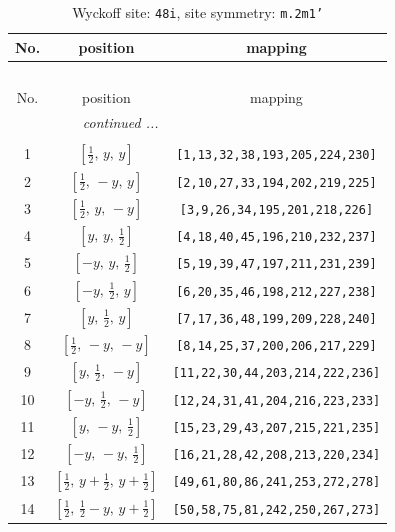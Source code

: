 \documentclass[fleqn,8pt]{jsarticle}
\begin{document}
\begin{longtable}{ccc}
\caption{Wyckoff site: {\tt 48i}, site symmetry: {\tt m.2m1'}}
 \\
 \hline \hline
No. & position & mapping \\ \hline \endfirsthead

\multicolumn{2}{l}{\tablename\ \thetable{}} \\
 \hline \hline
No. & position & mapping \\ \hline \endhead

 \hline \hline
\multicolumn{2}{r}{\footnotesize\it continued ...} \\ \endfoot

 \hline \hline
\multicolumn{2}{r}{} \\ \endlastfoot

1 & $\left[ \frac{1}{2},\, y,\, y \right]$ & {\tt [1,13,32,38,193,205,224,230]} \\ \hline
2 & $\left[ \frac{1}{2},\, - y,\, y \right]$ & {\tt [2,10,27,33,194,202,219,225]} \\ \hline
3 & $\left[ \frac{1}{2},\, y,\, - y \right]$ & {\tt [3,9,26,34,195,201,218,226]} \\ \hline
4 & $\left[ y,\, y,\, \frac{1}{2} \right]$ & {\tt [4,18,40,45,196,210,232,237]} \\ \hline
5 & $\left[ - y,\, y,\, \frac{1}{2} \right]$ & {\tt [5,19,39,47,197,211,231,239]} \\ \hline
6 & $\left[ - y,\, \frac{1}{2},\, y \right]$ & {\tt [6,20,35,46,198,212,227,238]} \\ \hline
7 & $\left[ y,\, \frac{1}{2},\, y \right]$ & {\tt [7,17,36,48,199,209,228,240]} \\ \hline
8 & $\left[ \frac{1}{2},\, - y,\, - y \right]$ & {\tt [8,14,25,37,200,206,217,229]} \\ \hline
9 & $\left[ y,\, \frac{1}{2},\, - y \right]$ & {\tt [11,22,30,44,203,214,222,236]} \\ \hline
10 & $\left[ - y,\, \frac{1}{2},\, - y \right]$ & {\tt [12,24,31,41,204,216,223,233]} \\ \hline
11 & $\left[ y,\, - y,\, \frac{1}{2} \right]$ & {\tt [15,23,29,43,207,215,221,235]} \\ \hline
12 & $\left[ - y,\, - y,\, \frac{1}{2} \right]$ & {\tt [16,21,28,42,208,213,220,234]} \\ \hline
13 & $\left[ \frac{1}{2},\, y + \frac{1}{2},\, y + \frac{1}{2} \right]$ & {\tt [49,61,80,86,241,253,272,278]} \\ \hline
14 & $\left[ \frac{1}{2},\, \frac{1}{2} - y,\, y + \frac{1}{2} \right]$ & {\tt [50,58,75,81,242,250,267,273]} \\ \hline

\end{longtable}
\end{document}
